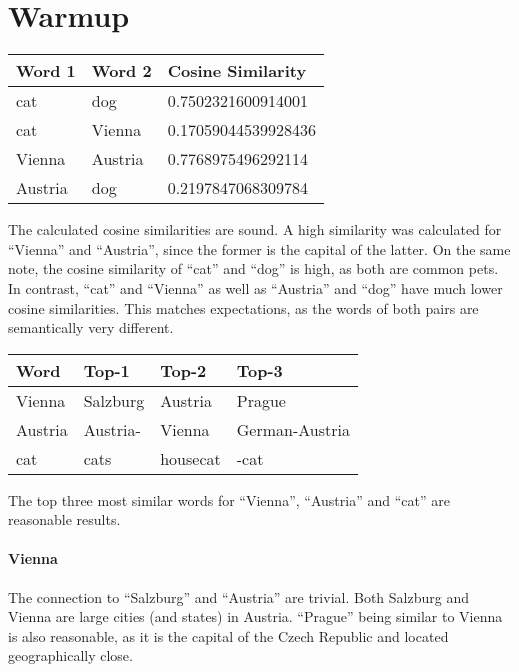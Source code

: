 \section{Warmup}

\begin{table}[hb]
\center
\begin{tabular}{|l|l|l|}
\hline
\textbf{Word 1} & \textbf{Word 2} & \textbf{Cosine Similarity} \\ \hline
cat             & dog             & 0.7502321600914001         \\ \hline
cat             & Vienna          & 0.17059044539928436        \\ \hline
Vienna          & Austria         & 0.7768975496292114         \\ \hline
Austria         & dog             & 0.2197847068309784         \\ \hline
\end{tabular}
\end{table}

The calculated cosine similarities are sound.
A high similarity was calculated for \enquote{Vienna} and \enquote{Austria}, since the former is the capital of the latter.
On the same note, the cosine similarity of \enquote{cat} and \enquote{dog} is high, as both are common pets.
In contrast, \enquote{cat} and \enquote{Vienna} as well as \enquote{Austria} and \enquote{dog} have much lower cosine similarities.
This matches expectations, as the words of both pairs are semantically very different.

\begin{table}[hb]
\center
\begin{tabular}{|l|l|l|l|}
\hline
\textbf{Word} & \textbf{Top-1} & \textbf{Top-2} & \textbf{Top-3} \\ \hline
Vienna        & Salzburg       & Austria        & Prague         \\ \hline
Austria       & Austria-       & Vienna         & German-Austria \\ \hline
cat           & cats           & housecat       & -cat           \\ \hline
\end{tabular}
\end{table}

The top three most similar words for \enquote{Vienna}, \enquote{Austria} and \enquote{cat} are reasonable results.

\paragraph{Vienna}
The connection to \enquote{Salzburg} and \enquote{Austria} are trivial. Both Salzburg and Vienna are large cities (and states) in Austria.
\enquote{Prague} being similar to Vienna is also reasonable, as it is the capital of the Czech Republic and located geographically close.

